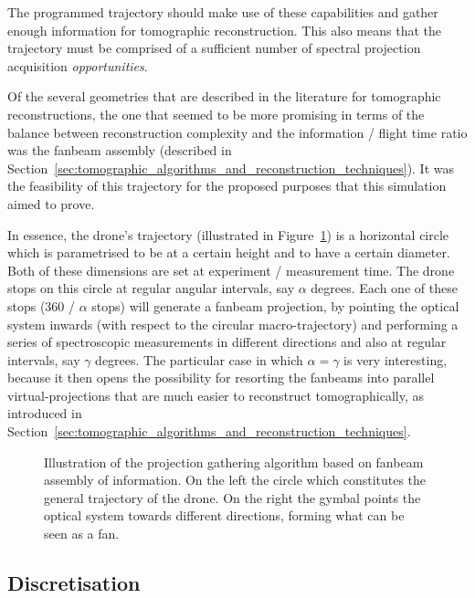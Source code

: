 The programmed trajectory should make use of these capabilities and
gather enough information for tomographic reconstruction. This also
means that the trajectory must be comprised of a sufficient number of
spectral projection acquisition \emph{opportunities}.

Of the several geometries that are described in the literature for
tomographic reconstructions, the one that seemed to be more promising in
terms of the balance between reconstruction complexity and the
information / flight time ratio was the fanbeam assembly (described in
Section~\ref{sec:tomographic_algorithms_and_reconstruction_techniques}).
It was the feasibility of this trajectory for the proposed purposes that
this simulation aimed to prove.

In essence, the drone's trajectory (illustrated in
Figure~\ref{fig:illustriated_trajectory_and_fanbeam_formation}) is a
horizontal circle which is parametrised to be at a certain height and to
have a certain diameter.  Both of these dimensions are set at experiment
/ measurement time. The drone stops on this circle at regular angular
intervals, say $\alpha$ degrees. Each one of these stops (360 / $\alpha$
stops) will generate a fanbeam projection, by pointing the optical
system inwards (with respect to the circular macro-trajectory) and
performing a series of spectroscopic measurements in different
directions and also at regular intervals, say $\gamma$ degrees. The
particular case in which $\alpha = \gamma$ is very interesting, because
it then opens the possibility for resorting the fanbeams into parallel
virtual-projections that are much easier to reconstruct tomographically,
as introduced in
Section~\ref{sec:tomographic_algorithms_and_reconstruction_techniques}.  

\begin{figure}[htpb]
    \centering
    \missingfigure{}
    \caption{Illustration of the projection gathering algorithm based on
    fanbeam assembly of information. On the left the circle which
    constitutes the general trajectory of the drone. On the right the
    gymbal points the optical system towards different directions, forming
    what can be seen as a fan.}
    \label{fig:illustriated_trajectory_and_fanbeam_formation}
\end{figure}

\subsection{Discretisation}%
\label{sub:discretisation}

